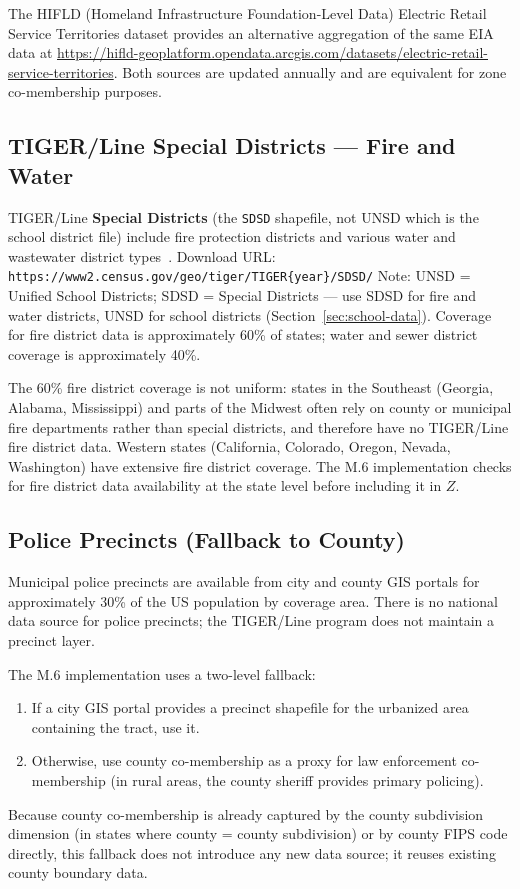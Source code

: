 The HIFLD (Homeland Infrastructure Foundation-Level Data) Electric Retail Service
Territories dataset provides an alternative aggregation of the same EIA data at
\url{https://hifld-geoplatform.opendata.arcgis.com/datasets/electric-retail-service-territories}.
Both sources are updated annually and are equivalent for zone co-membership purposes.

\subsection{TIGER/Line Special Districts --- Fire and Water}

TIGER/Line \textbf{Special Districts} (the \texttt{SDSD} shapefile, not UNSD which
is the school district file) include fire protection districts and various water
and wastewater district types~\citep{census2020tiger}.
Download URL: \texttt{https://www2.census.gov/geo/tiger/TIGER\{year\}/SDSD/}
Note: UNSD = Unified School Districts; SDSD = Special Districts --- use SDSD for
fire and water districts, UNSD for school districts (Section~\ref{sec:school-data}).
Coverage for fire district data is approximately 60\% of states; water and sewer
district coverage is approximately 40\%.

The 60\% fire district coverage is not uniform: states in the Southeast (Georgia,
Alabama, Mississippi) and parts of the Midwest often rely on county or municipal
fire departments rather than special districts, and therefore have no TIGER/Line
fire district data.
Western states (California, Colorado, Oregon, Nevada, Washington) have extensive
fire district coverage.
The M.6 implementation checks for fire district data availability at the state level
before including it in $Z$.

\subsection{Police Precincts (Fallback to County)}

Municipal police precincts are available from city and county GIS portals for
approximately 30\% of the US population by coverage area.
There is no national data source for police precincts; the TIGER/Line program does
not maintain a precinct layer.

The M.6 implementation uses a two-level fallback:
\begin{enumerate}
  \item If a city GIS portal provides a precinct shapefile for the urbanized area
    containing the tract, use it.
  \item Otherwise, use county co-membership as a proxy for law enforcement co-membership
    (in rural areas, the county sheriff provides primary policing).
\end{enumerate}
Because county co-membership is already captured by the county subdivision dimension
(in states where county = county subdivision) or by county FIPS code directly,
this fallback does not introduce any new data source; it reuses existing county
boundary data.


